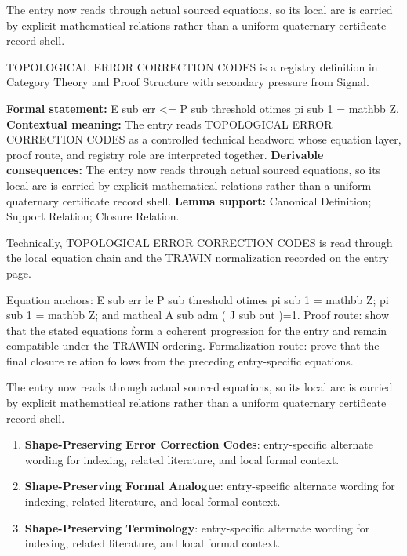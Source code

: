 The entry now reads through actual sourced equations, so its local arc is carried by explicit mathematical relations rather than a uniform quaternary certificate record shell.
\clearpage


\begingroup\small
{}
TOPOLOGICAL ERROR CORRECTION CODES is a registry definition in Category Theory and Proof Structure with secondary pressure from Signal.

\begingroup\footnotesize\setlength{\emergencystretch}{3em}\sloppy
\textbf{Formal statement:} E sub err <= P sub threshold otimes pi sub 1 = mathbb Z. \textbf{Contextual meaning:} The entry reads TOPOLOGICAL ERROR CORRECTION CODES as a controlled technical headword whose equation layer, proof route, and registry role are interpreted together. \textbf{Derivable consequences:} The entry now reads through actual sourced equations, so its local arc is carried by explicit mathematical relations rather than a uniform quaternary certificate record shell. \textbf{Lemma support:} Canonical Definition; Support Relation; Closure Relation.\par
\endgroup

Technically, TOPOLOGICAL ERROR CORRECTION CODES is read through the local equation chain and the TRAWIN normalization recorded on the entry page.

Equation anchors: E sub err le P sub threshold otimes pi sub 1 = mathbb Z; pi sub 1 = mathbb Z; and mathcal A sub adm ( J sub out )=1. Proof route: show that the stated equations form a coherent progression for the entry and remain compatible under the TRAWIN ordering. Formalization route: prove that the final closure relation follows from the preceding entry-specific equations.

The entry now reads through actual sourced equations, so its local arc is carried by explicit mathematical relations rather than a uniform quaternary certificate record shell.
\endgroup

\begin{enumerate}[leftmargin=1.6em,itemsep=6pt,topsep=4pt]
\item \textbf{Shape-Preserving Error Correction Codes}: entry-specific alternate wording for indexing, related literature, and local formal context.
\item \textbf{Shape-Preserving Formal Analogue}: entry-specific alternate wording for indexing, related literature, and local formal context.
\item \textbf{Shape-Preserving Terminology}: entry-specific alternate wording for indexing, related literature, and local formal context.
\end{enumerate}


